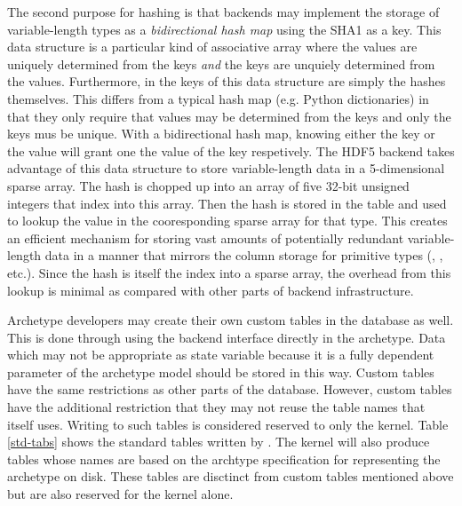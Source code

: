 The second purpose for hashing is that backends may implement the storage 
of variable-length types as a \emph{bidirectional hash map} using the SHA1 as a key.
This data structure is a particular kind of associative array where the values are 
uniquely determined from the keys \emph{and} the keys are unquiely determined from 
the values. Furthermore, in \cyclus the keys of this data structure are simply the 
hashes themselves. This differs from a typical hash map (e.g. Python dictionaries) 
in that they only require that values may be determined from the keys and only the
keys mus be unique.  With a bidirectional hash map, knowing either the key or the value
will grant one the value of the key respetively.  The HDF5 backend takes advantage 
of this data structure to store variable-length data in a 5-dimensional sparse array.
The hash is chopped up into an array of five 32-bit unsigned integers that 
index into this array. Then the hash is stored in the table and used to lookup 
the value in the cooresponding sparse array for that type.  This creates an efficient 
mechanism for storing vast amounts of potentially redundant variable-length data in 
a manner that mirrors the column storage for primitive types (, , 
etc.). Since the hash is itself the index into a sparse array, the overhead from 
this lookup is minimal as compared with other parts of backend infrastructure.

Archetype developers may create their own custom tables in the database as well.
This is done through using the backend interface directly in the archetype. Data 
which may not be appropriate as state variable because it is a fully dependent 
parameter of the archetype model should be stored in this way.  Custom tables 
have the same restrictions as other parts of the database.  However, custom tables
have the additional restriction that they may not reuse the table names that 
\cyclus itself uses. Writing to such tables is considered reserved to only
the kernel. 
Table \ref{std-tabs} shows the standard tables written by \cyclus.
The kernel will also produce tables whose names are based on the 
archtype specification for representing the archetype on disk.  These tables
are disctinct from custom tables mentioned above but are also reserved for the 
kernel alone. 

